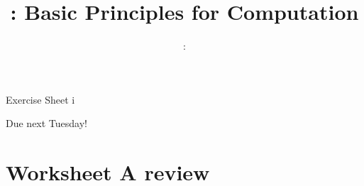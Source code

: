 \usepackage{../../beamerthemeFalmouthGamesAcademy}
\usepackage{multimedia}
\graphicspath{ {../../} }


\usepackage[normalem]{ulem}
\usepackage{wasysym}

\usepackage{pdfpages}

\usetikzlibrary{arrows,automata}




\title{\sessionnumber: Basic Principles for Computation}
\subtitle{\modulecode: \moduletitle}

\frame{\titlepage} 





\begin{frame}{Exercise Sheet i}
  \begin{center}
      Due next Tuesday!
  \end{center}
\end{frame}



\part{Worksheet A review}
\frame{\partpage}


